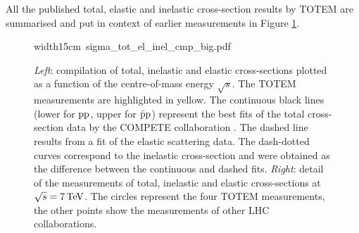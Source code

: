 \documentclass{desyproc}
\def\un#1{\,{\rm #1}}
\begin{document}
All the published total, elastic and inelastic cross-section results by TOTEM are summarised and put in context of earlier measurements in Figure \ref{fig:sigmas}.

\begin{figure}
\begin{center}
\leavevmode
\hbox{\pdfximage width15cm {sigma_tot_el_inel_cmp_big.pdf}\pdfrefximage\pdflastximage}
\caption{%
{\em Left}: compilation \cite{si_tot_8,si_tot_7,pdg,alice_inel,atlas_inel_7,cms_inel_7,auger} of total, inelastic and elastic cross-sections plotted as a function of the centre-of-mass energy $\sqrt s$. The TOTEM measurements are highlighted in yellow. The continuous black lines (lower for $\rm pp$, upper for $\rm \bar pp$) represent the best fits of the total cross-section data by the COMPETE collaboration \cite{compete}. The dashed line results from a fit of the elastic scattering data. The dash-dotted curves correspond to the inelastic cross-section and were obtained as the difference between the continuous and dashed fits.\hfil\break
{\em Right}: detail of the measurements of total, inelastic and elastic cross-sections at $\sqrt s = 7\un{TeV}$. The circles represent the four TOTEM measurements, the other points show the measurements of other LHC collaborations.
}
\label{fig:sigmas}
\end{center}
\end{figure}





 

\def\Name#1{#1,}
\def\Review#1#2#3#4{#1 {\bf#2} #4 (#3)}

\eject
\end{document}
